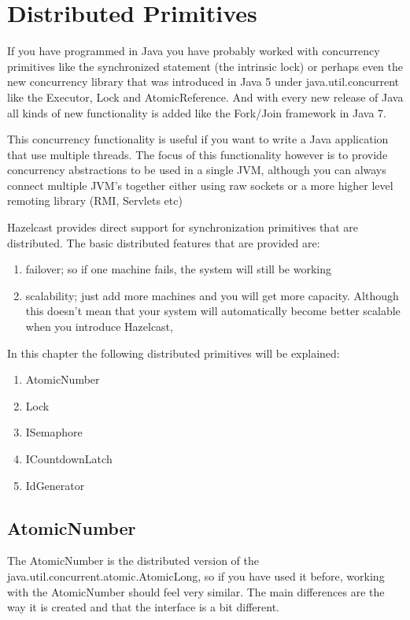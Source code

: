\chapter{Distributed Primitives}

If you have programmed in Java you have probably worked with concurrency primitives like the synchronized statement (the intrinsic lock) or perhaps even the new concurrency library that was introduced in Java 5 under java.util.concurrent like the Executor, Lock and AtomicReference. And with every new release of Java all kinds of new functionality is added like the Fork/Join framework in Java 7.

This concurrency functionality is useful if you want to write a Java application that use multiple threads. The focus of this functionality however is to provide concurrency abstractions to be used in a single JVM, although you can always connect multiple JVM's together either using raw sockets or a more higher level remoting library (RMI, Servlets etc)

Hazelcast provides direct support for synchronization primitives that are distributed. The basic distributed features that are provided are:
\begin{enumerate}
\item failover; so if one machine fails, the system will still be working
\item scalability; just add more machines and you will get more capacity. Although this doesn't mean that your system will automatically become better scalable when you introduce Hazelcast, 
\end{enumerate}

In this chapter the following distributed primitives will be explained:
\begin{enumerate}
\item AtomicNumber
\item Lock
\item ISemaphore
\item ICountdownLatch
\item IdGenerator
\end{enumerate}

\section{AtomicNumber}

The AtomicNumber is the distributed version of the java.util.concurrent.atomic.AtomicLong, so if you have used it before, working with the AtomicNumber should feel very similar. The main differences are the way it is created and that the interface is a bit different.

